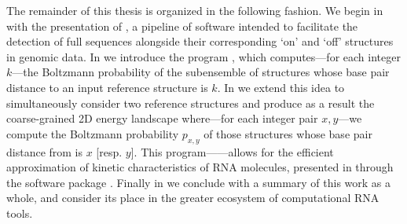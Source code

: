 The remainder of this thesis is organized in the following fashion. We begin in
 with the presentation of \rfinder, a pipeline of
software intended to facilitate the detection of full \rb sequences
alongside their corresponding `on' and `off' structures in genomic data. In
 we introduce the program \fftbor, which computes---for
each integer $k$---the Boltzmann probability \pk of the subensemble of structures
whose base pair distance to an input reference structure \str is $k$.
In  we extend this idea to simultaneously consider two
reference structures \strST and produce as a result the coarse-grained 2D energy
landscape where---for each integer pair $x,y$---we compute the Boltzmann
probability $p_{x,y}$
of those structures whose base pair distance from  is $x$
[resp. $y$]. This program---\ffttwo---allows for the efficient approximation of
kinetic characteristics of RNA molecules, presented in 
through the software package \hermes. Finally in  we conclude
with a summary of this work as a whole, and consider its place in the greater
ecosystem of computational RNA tools.

